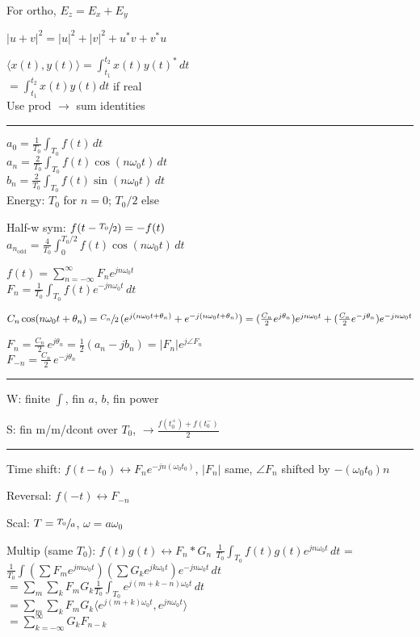 \documentclass[4pt]{article}
\theoremstyle{definition}
\theoremstyle{definition}
\newcommand{\ra}{\rightarrow}
\newcommand{\lra}{\leftrightarrow}
\begin{document}
    For ortho, $E_z = E_x + E_y$
        

    $|u+v|^2 = |u|^2 + |v|^2 + u^*v + v^*u$

    $\langle x(t), y(t)\rangle = \int_{t_1}^{t_2} x(t) y(t)^* \, dt$\\
    \( = \int_{t_1}^{t_2} x(t) y(t) dt\) if real\\
    Use prod $\ra$ sum identities
\rule{\linewidth}{0.5pt}
    $a_0 = \frac{1}{T_0} \int_{T_0} f(t)\, dt$\\
    $a_n = \frac{2}{T_0} \int_{T_0} f(t) \cos(n\omega_0t)\,dt$\\
    $b_n = \frac{2}{T_0} \int_{T_0} f(t) \sin(n\omega_0t)\,dt$\\
    Energy: $T_0$ for $n=0$; $T_0/2$ else
     
    Half-w sym: $f(t - \sfrac{T_0}{2}) = -f(t)$\\
    $a_{n_\mathrm{odd}} = \frac{4}{T_0}\int_{0}^{T_0/2} f(t) \cos (n\omega_0 t) \, dt$

    $f(t) = \sum_{n=-\infty}^{\infty} F_n e^{jn\omega_0 t}$\\
    $F_n = \frac{1}{T_0}\int_{T_0} f(t) e^{-jn\omega_0t}\,dt$

    $C_n\cos(n\omega_0 t + \theta_n) = \sfrac{C_n}{2} \, (e^{j(n\omega_0t + \theta_n)} + e^{-j(n\omega_0 t + \theta_n)}) = (\frac{C_n} 2 e^{j\theta_n}) e^{jn\omega_0 t} + (\frac{C_n} 2 e^{-j\theta_n}) e^{-jn\omega_0 t}$

    $F_n = \frac{C_n}{2}\, e^{j\theta_n} = \frac 1 2 (a_n - jb_n) = |F_n| e^{j\angle F_n}$\\
    $F_{-n} = \frac{C_n}{2}\, e^{-j\theta_n}$
\rule{\linewidth}{0.5pt}
    W: finite $\int$, fin $a$, $b$, fin power

    S: fin m/m/dcont over $T_0$, $\ra \frac{f(t_0^+) + f(t_0^-)}{2}$
\rule{\linewidth}{0.5pt}
    Time shift: $f(t-t_0)\lra F_n e^{-jn(\omega_0 t_0)}$, $|F_n|$ same, $\angle F_n$ shifted by $-(\omega_0 t_0)n$

    Reversal: $f(-t)\lra F_{-n}$

    Scal: $T = \sfrac {T_0} a$, $\omega = a\omega_0$

    Multip (same $T_0$): $f(t) g(t) \lra F_n * G_n$ 
        $\frac 1{T_0}  \int_{T_0} f(t) g(t) e^{jn\omega_0 t}\, dt$ =\\
        $ \frac{1}{T_0} \int (\sum F_m e^{jm\omega_0 t}) (\sum G_k e^{jk\omega_0 t}) e^{-jn\omega_0 t} \, dt$ \\
        $ = \sum_m \sum_k F_m G_k \frac{1}{T_0} \int_{T_0} e^{j(m+k-n)\omega_0 t} \, dt$\\
        $ = \sum_m \sum_k F_m G_k \langle e^{j(m+k)\omega_0 t}, e^{jn\omega_0 t}\rangle$\\
        $ = \sum_{k=-\infty}^{\infty} G_k F_{n-k}$
        
\end{document}
